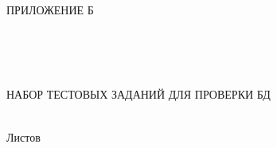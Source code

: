 \begin{ESKDtitlePage}
  \begin{flushright}
    ПРИЛОЖЕНИЕ Б \enspace
  \end{flushright}
  
  \begin{center}
    \envDiplomEducation \\
    \envDiplomUniversity \\
    \envDiplomCathedra \\
  \end{center}

  \vfill

  \begin{center}
    НАБОР ТЕСТОВЫХ ЗАДАНИЙ ДЛЯ ПРОВЕРКИ БД
  \end{center}

  \vfill

  \begin{center}
    \envCode \\
    Листов \pageref{LastPage} \\
  \end{center}

  \vfill

  

  \vfill

  \begin{center}
    \ESKDtheYear
  \end{center}
\end{ESKDtitlePage}
